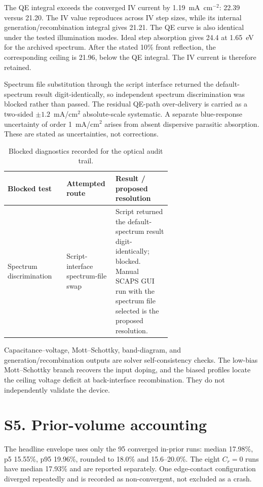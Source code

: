 \documentclass[11pt,a4paper]{article}
\begin{document}
The QE integral exceeds the converged IV current by 1.19~mA~cm$^{-2}$: 22.39 versus 21.20. The IV value reproduces across IV step sizes, while its internal generation/recombination integral gives 21.21. The QE curve is also identical under the tested illumination modes. Ideal step absorption gives 24.4 at 1.65~eV for the archived spectrum. After the stated 10\% front reflection, the corresponding ceiling is 21.96, below the QE integral. The IV current is therefore retained.

Spectrum file substitution through the script interface returned the default-spectrum result digit-identically, so independent spectrum discrimination was blocked rather than passed. The residual QE-path over-delivery is carried as a two-sided $\pm1.2$~mA/cm$^2$ absolute-scale systematic. A separate blue-response uncertainty of order 1~mA/cm$^2$ arises from absent dispersive parasitic absorption. These are stated as uncertainties, not corrections.

\begin{table}[h]
\centering
\small
\begin{tabular}{|l|p{0.30\linewidth}|p{0.34\linewidth}|}
\hline
Blocked test & Attempted route & Result / proposed resolution \\
\hline
Spectrum discrimination & Script-interface spectrum-file swap & Script returned the default-spectrum result digit-identically; blocked. Manual SCAPS GUI run with the spectrum file selected is the proposed resolution. \\
\hline
\end{tabular}
\caption{Blocked diagnostics recorded for the optical audit trail.}
\end{table}

Capacitance--voltage, Mott--Schottky, band-diagram, and generation/recombination outputs are solver self-consistency checks. The low-bias Mott--Schottky branch recovers the input doping, and the biased profiles locate the ceiling voltage deficit at back-interface recombination. They do not independently validate the device.

\section*{S5. Prior-volume accounting}

The headline envelope uses only the 95 converged in-prior runs: median 17.98\%, p5 15.55\%, p95 19.96\%, rounded to 18.0\% and 15.6--20.0\%. The eight $C_r=0$ runs have median 17.93\% and are reported separately. One edge-contact configuration diverged repeatedly and is recorded as non-convergent, not excluded as a crash.
\end{document}
